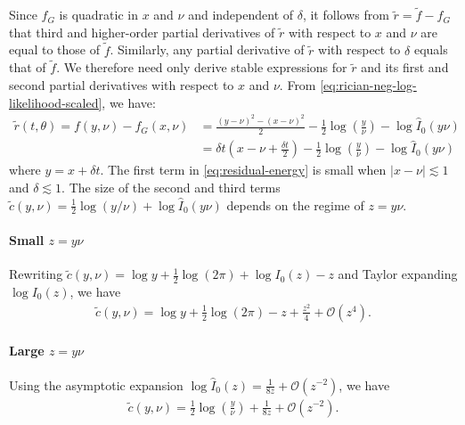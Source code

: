 \documentclass{article}
\begin{document}
Since $f_G$ is quadratic in $x$ and $\nu$ and independent of $\delta$, it follows from $\tilde{r} = \tilde{f} - f_G$ that third and higher-order partial derivatives of $\tilde{r}$ with respect to $x$ and $\nu$ are equal to those of $\tilde{f}$.
Similarly, any partial derivative of $\tilde{r}$ with respect to $\delta$ equals that of $\tilde{f}$.
We therefore need only derive stable expressions for $\tilde{r}$ and its first and second partial derivatives with respect to $x$ and $\nu$.
From \cref{eq:rician-neg-log-likelihood-scaled}, we have:
%
\begin{align}
  \tilde{r}(t,\theta) = f(y, \nu) - f_G(x,\nu) & = \frac{(y-\nu)^2 - (x-\nu)^2}{2} - \frac{1}{2}\log\left(\frac{y}{\nu}\right) - \log \hat{I}_0(y \nu)                                               \\
                                               & = \delta t \left(x - \nu + \frac{\delta t}{2}\right) - \frac{1}{2}\log\left(\frac{y}{\nu}\right) - \log \hat{I}_0(y \nu) \label{eq:residual-energy}
\end{align}
%
where $y = x + \delta t$.
The first term in \cref{eq:residual-energy} is small when $|x-\nu| \lesssim 1$ and $\delta \lesssim 1$.
The size of the second and third terms $\tilde{c}(y,\nu) = \frac{1}{2}\log(y/\nu) + \log\hat{I}_0(y\nu)$ depends on the regime of $z=y\nu$.

\paragraph{Small $z=y\nu$}

Rewriting $\tilde{c}(y,\nu) = \log y + \frac{1}{2}\log(2\pi) + \log I_0(z) - z$ and Taylor expanding $\log I_0(z)$, we have
%
\begin{align}\label{eq:c-small-z}
  \tilde{c}(y,\nu) = \log y + \frac{1}{2}\log(2\pi) - z + \frac{z^2}{4} + \mathcal{O}(z^4).
\end{align}

\paragraph{Large $z=y\nu$}

Using the asymptotic expansion $\log \hat{I}_0(z) = \frac{1}{8z} + \mathcal{O}(z^{-2})$, we have
%
\begin{align}\label{eq:c-large-z}
  \tilde{c}(y,\nu) = \frac{1}{2}\log\left(\frac{y}{\nu}\right) + \frac{1}{8z} + \mathcal{O}(z^{-2}).
\end{align}
\end{document}
